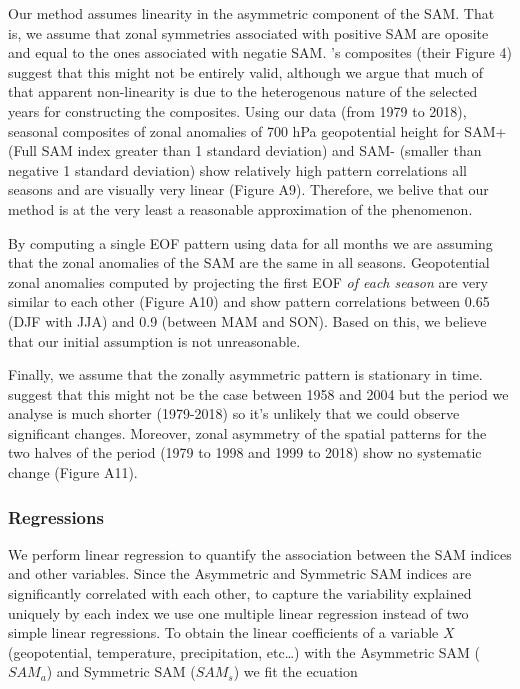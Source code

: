 \documentclass[]{ametsocV5}
\begin{document}
Our method assumes linearity in the asymmetric component of the SAM.
That is, we assume that zonal symmetries associated with positive SAM
are oposite and equal to the ones associated with negatie SAM.
\citet{fogt2012}'s composites (their Figure 4) suggest that this might
not be entirely valid, although we argue that much of that apparent
non-linearity is due to the heterogenous nature of the selected years
for constructing the composites. Using our data (from 1979 to 2018),
seasonal composites of zonal anomalies of 700 hPa geopotential height
for SAM+ (Full SAM index greater than 1 standard deviation) and SAM-
(smaller than negative 1 standard deviation) show relatively high
pattern correlations all seasons and are visually very linear (Figure
A9). Therefore, we belive that our method is at the very least a
reasonable approximation of the phenomenon.

By computing a single EOF pattern using data for all months we are
assuming that the zonal anomalies of the SAM are the same in all
seasons. Geopotential zonal anomalies computed by projecting the first
EOF \emph{of each season} are very similar to each other (Figure A10)
and show pattern correlations between 0.65 (DJF with JJA) and 0.9
(between MAM and SON). Based on this, we believe that our initial
assumption is not unreasonable.

Finally, we assume that the zonally asymmetric pattern is stationary in
time. \citet{silvestri2009} suggest that this might not be the case
between 1958 and 2004 but the period we analyse is much shorter
(1979-2018) so it's unlikely that we could observe significant changes.
Moreover, zonal asymmetry of the spatial patterns for the two halves of
the period (1979 to 1998 and 1999 to 2018) show no systematic change
(Figure A11).

\subsubsection{Regressions}

We perform linear regression to quantify the association between the SAM
indices and other variables. Since the Asymmetric and Symmetric SAM
indices are significantly correlated with each other, to capture the
variability explained uniquely by each index we use one multiple linear
regression instead of two simple linear regressions. To obtain the
linear coefficients of a variable \(X\) (geopotential, temperature,
precipitation, etc\ldots{}) with the Asymmetric SAM (\(SAM_a\)) and
Symmetric SAM (\(SAM_s\)) we fit the ecuation
\end{document}
